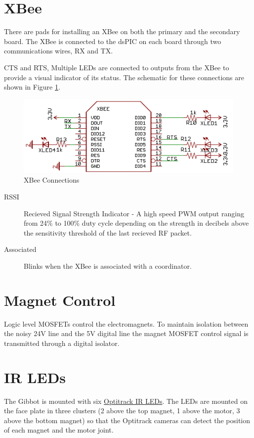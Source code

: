 \documentclass{article}
\begin{document}
\section{XBee}
There are pads for installing an XBee on both the primary and the secondary board. The XBee is connected to the dsPIC on each board through two communications wires, RX and TX. 

 CTS and RTS, 
Multiple LEDs are connected to outputs from the XBee to provide a visual indicator of its status. The schematic for these connections are shown in Figure \ref{xbee}.
\begin{figure}
	\caption{XBee Connections}
	\centering
	\label{xbee}
	\includegraphics{XbeeDatasheet}
\end{figure}
\begin{description}
\item[RSSI] Recieved Signal Strength Indicator - A high speed PWM output ranging from 24\% to 100\% duty cycle depending on the strength in decibels above the sensitivity threshold of the last recieved RF packet.
\item[Associated] Blinks when the XBee is associated with a coordinator.
\end{description}

\section{Magnet Control}
Logic level MOSFETs control the electromagnets. To maintain isolation between the noisy 24V line and the 5V digital line the magnet MOSFET control signal is transmitted through a digital isolator.

\section{IR LEDs}
The Gibbot is mounted with six \href{http://www.naturalpoint.com/optitrack/static/documents/850\%20nm\%20IR\%20LED\%20Data\%20Sheet.pdf}{Optitrack IR LEDs}.
The LEDs are mounted on the face plate in three clusters (2 above the top magnet, 1 above the motor, 3 above the bottom magnet) so that the Optitrack cameras can detect the position of each magnet and the motor joint. 
\end{document}
